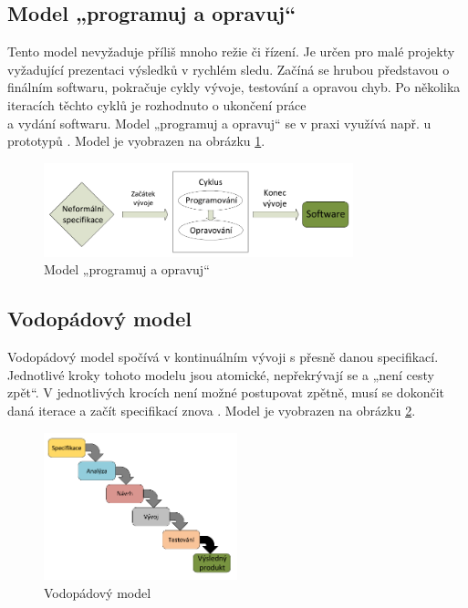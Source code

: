 \subsection{Model „programuj a opravuj“}
Tento model nevyžaduje příliš mnoho režie či řízení. Je určen pro malé projekty vyžadující prezentaci výsledků v rychlém sledu. Začíná se hrubou představou o finálním softwaru, pokračuje cykly vývoje, testování a opravou chyb. Po několika iteracích těchto cyklů je rozhodnuto o ukončení práce \\a vydání softwaru. Model „programuj a opravuj“ se v praxi využívá např. u prototypů \cite{Patton2002}. Model je vyobrazen na obrázku \ref{fig:program-and-repair-model}.


\begin{figure}[h]
	\centering
	\includegraphics[width=0.8\textwidth]{Figures/ProgramujOpravuj.pdf}
	\caption{Model „programuj a opravuj“}
	\label{fig:program-and-repair-model}
\end{figure}

\subsection{Vodopádový model}
Vodopádový model spočívá v kontinuálním vývoji s přesně danou specifikací. Jednotlivé kroky tohoto modelu jsou atomické, nepřekrývají se a „není cesty zpět“. V jednotlivých krocích není možné postupovat zpětně, musí se dokončit daná iterace a začít specifikací znova \cite{Patton2002}. Model je vyobrazen na obrázku \ref{fig:waterfall-model}.

\begin{figure}[!h]
	\centering
	\includegraphics[width=0.5\textwidth]{Figures/waterfall.pdf}
	\caption{Vodopádový model}
	\label{fig:waterfall-model}
\end{figure}
\newpage

